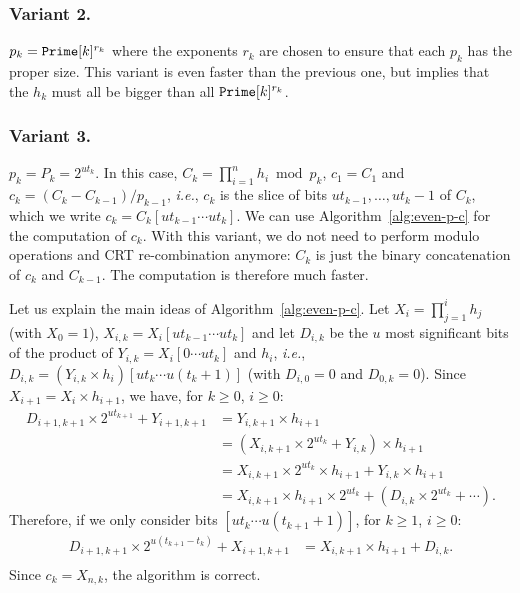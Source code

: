 \documentclass{llncs}
\begin{document}
\subsubsection{Variant 2.} $p_k=\mbox{{\tt Prime}}[k]^{r_k}$ where the exponents $r_k$ are chosen to ensure that each $p_k$ has the proper size.
This variant is even faster than the previous one, but implies that the $h_k$ must all be bigger than all
$\mbox{{\tt Prime}}[k]^{r_k}$.

\subsubsection{Variant 3.} $p_k = P_k = 2^{ut_k}$. 
In this case, $C_k = \prod_{i=1}^n h_i \bmod p_k$, $c_1 = C_1$ and $c_k = (C_k - C_{k-1}) / p_{k-1}$, {\it i.e.}, $c_k$ is the slice of bits $ut_{k-1}, \dots, ut_k-1$ of $C_k$, which we write $c_k = C_k[ut_{k-1}\cdots ut_k]$.
We can use Algorithm~\ref{alg:even-p-c} for the computation of $c_k$. With this variant, we do not need to perform modulo operations and CRT re-combination anymore: $C_k$ is just the binary concatenation of $c_k$ and $C_{k-1}$. The computation is therefore much faster.

Let us explain the main ideas of Algorithm~\ref{alg:even-p-c}.
Let $X_i = \prod_{j=1}^i h_j$ (with $X_0 = 1$), $X_{i,k} = X_i[ut_{k-1}\cdots ut_{k}]$ and let $D_{i,k}$ be the $u$ most significant bits of the product of $Y_{i,k} = X_i[0\cdots ut_{k}]$ and $h_i$, {\it i.e.}, $D_{i,k} = (Y_{i,k} \times h_i)[ut_k\cdots u(t_k+1)]$ (with $D_{i,0} = 0$ and $D_{0,k} = 0$).
Since $X_{i+1} = X_i \times h_{i+1}$, we have, for $k \ge 0$, $i \ge 0$:
\begin{align*}
  D_{i+1,k+1} \times 2^{ut_{k+1}} + Y_{i+1,k+1} &= Y_{i,k+1} \times h_{i+1} \\
                 &= (X_{i,k+1} \times 2^{ut_{k}} + Y_{i,k}) \times h_{i+1} \\
                 &= X_{i,k+1} \times 2^{ut_k} \times h_{i+1} + Y_{i,k} \times h_{i+1} \\
                 &= X_{i,k+1}  \times h_{i+1} \times 2^{ut_k} + (D_{i,k} \times 2^{ut_k} + \cdots).
\end{align*}
Therefore, if we only consider bits $[ut_k \cdots u(t_{k+1}+1)]$, for $k\ge1$, $i\ge0$:
\begin{align*}
  D_{i+1,k+1} \times 2^{u(t_{k+1}-t_k)} + X_{i+1,k+1} &= X_{i,k+1} \times h_{i+1} + D_{i,k}. \\
\end{align*}
Since $c_k = X_{n,k}$, the algorithm is correct.
\end{document}
